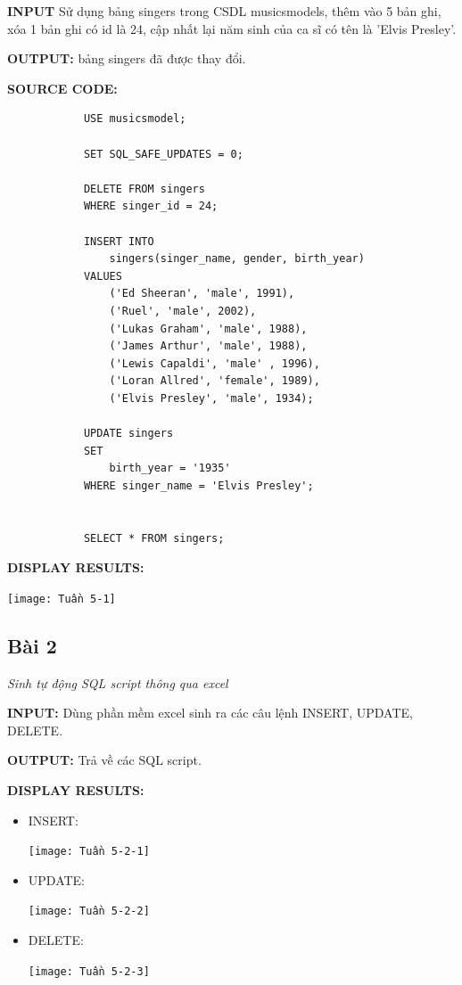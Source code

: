 \documentclass[12pt,a4paper]{report}
\begin{document}
	{\bf INPUT} Sử dụng bảng singers trong CSDL musicsmodels, thêm vào 5 bản ghi, xóa 1 bản ghi có id là 24, cập nhất lại năm sinh của ca sĩ có tên là 'Elvis Presley'.
	
	{\bf OUTPUT:} bảng singers đã được thay đổi.
	
	{\bf SOURCE CODE:}
		\begin{lstlisting}
			USE musicsmodel;

			SET SQL_SAFE_UPDATES = 0;

			DELETE FROM singers
			WHERE singer_id = 24;

			INSERT INTO 
				singers(singer_name, gender, birth_year)
			VALUES 
				('Ed Sheeran', 'male', 1991),
        		('Ruel', 'male', 2002),
       			('Lukas Graham', 'male', 1988),
        		('James Arthur', 'male', 1988),
       			('Lewis Capaldi', 'male' , 1996),
        		('Loran Allred', 'female', 1989),
        		('Elvis Presley', 'male', 1934);

			UPDATE singers
			SET
				birth_year = '1935'
			WHERE singer_name = 'Elvis Presley';


			SELECT * FROM singers;
		\end{lstlisting}
		
	{\bf DISPLAY RESULTS:}
		\begin{center}
			\texttt{[image: Tuần 5-1]}
		\end{center}
\subsection{Bài 2}
	\begin{center}
		{\it Sinh tự động SQL script thông qua excel}
	\end{center}
	
	{\bf INPUT:} Dùng phần mềm excel sinh ra các câu lệnh INSERT, UPDATE, DELETE.
	
	{\bf OUTPUT:} Trả về các SQL script.
	
	{\bf DISPLAY RESULTS:}
		\begin{itemize}
			\item INSERT:
				\begin{center}
					\texttt{[image: Tuần 5-2-1]}
				\end{center}
			\item UPDATE:
				\begin{center}
					\texttt{[image: Tuần 5-2-2]}
				\end{center}
			\item DELETE:
				\begin{center}
					\texttt{[image: Tuần 5-2-3]}
				\end{center}
		\end{itemize}
\end{document}
